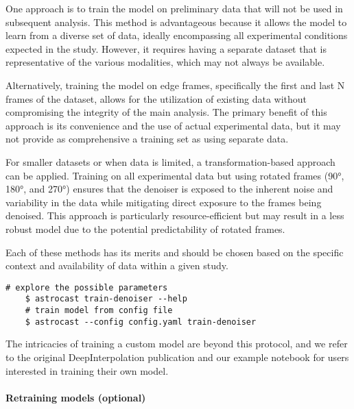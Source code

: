 One approach is to train the model on preliminary data that will not be used in subsequent analysis. This method is
advantageous because it allows the model to learn from a diverse set of data, ideally encompassing all experimental
conditions expected in the study. However, it requires having a separate dataset that is representative of the
various modalities, which may not always be available.

Alternatively, training the model on edge frames, specifically the first and last N frames of the dataset, allows for
the utilization of existing data without compromising the integrity of the main analysis. The primary benefit of this
approach is its convenience and the use of actual experimental data, but it may not provide as comprehensive a
training set as using separate data.

For smaller datasets or when data is limited, a transformation-based approach can be applied. Training on all
experimental data but using rotated frames (90°, 180°, and 270°) ensures that the denoiser is exposed to the inherent
noise and variability in the data while mitigating direct exposure to the frames being denoised. This approach is
particularly resource-efficient but may result in a less robust model due to the potential predictability of rotated
frames.

Each of these methods has its merits and should be chosen based on the specific context and availability of data
within a given study.

\begin{lstlisting}[style=bashStyle]
    # explore the possible parameters
    $ astrocast train-denoiser --help
    # train model from config file
    $ astrocast --config config.yaml train-denoiser
\end{lstlisting}

The intricacies of training a custom model are beyond this protocol, and we refer to the original DeepInterpolation
publication\citep{lecoq_removing_2021} and our example notebook\citep{
    noauthor_astrocastnotebooksexamplestrain_denoiser_modelsipynb_nodate} for users interested in training their own
model.


\paragraph{Retraining models (optional)}

